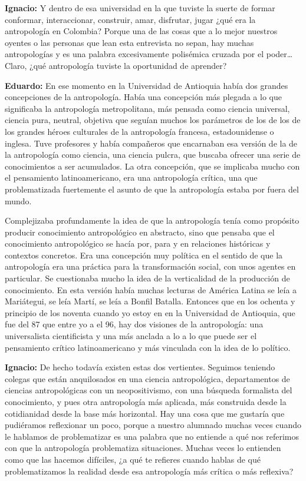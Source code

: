 \documentclass[
]{interact}
\begin{document}
\textbf{Ignacio:} Y dentro de esa universidad en la que tuviste la
suerte de formar conformar, interaccionar, construir, amar, disfrutar,
jugar ¿qué era la antropología en Colombia? Porque una de las cosas que
a lo mejor nuestros oyentes o las personas que lean esta entrevista no
sepan, hay muchas antropologías y es una palabra excesivamente
polisémica cruzada por el poder\ldots{} Claro, ¿qué antropología tuviste
la oportunidad de aprender?

\textbf{Eduardo:} En ese momento en la Universidad de Antioquia había
dos grandes concepciones de la antropología. Había una concepción más
plegada a lo que significaba la antropología metropolitana, más pensada
como ciencia universal, ciencia pura, neutral, objetiva que seguían
muchos los parámetros de los de los de los grandes héroes culturales de
la antropología francesa, estadounidense o inglesa. Tuve profesores y
había compañeros que encarnaban esa versión de la de la antropología
como ciencia, una ciencia pulcra, que buscaba ofrecer una serie de
conocimientos a ser acumulados. La otra concepción, que se implicaba
mucho con el pensamiento latinoamericano, era una antropología crítica,
una que problematizada fuertemente el asunto de que la antropología
estaba por fuera del mundo.

Complejizaba profundamente la idea de que la antropología tenía como
propósito producir conocimiento antropológico en abstracto, sino que
pensaba que el conocimiento antropológico se hacía por, para y en
relaciones históricas y contextos concretos. Era una concepción muy
política en el sentido de que la antropología era una práctica para la
transformación social, con unos agentes en particular. Se cuestionaba
mucho la idea de la verticalidad de la producción de conocimiento. En
esta versión había muchas lecturas de América Latina se leía a
Mariátegui, se leía Martí, se leía a Bonfil Batalla. Entonces que en los
ochenta y principio de los noventa cuando yo estoy en en la Universidad
de Antioquia, que fue del 87 que entre yo a el 96, hay dos visiones de
la antropología: una universalista cientificista y una más anclada a lo
a lo que puede ser el pensamiento crítico latinoamericano y más
vinculada con la idea de lo político.

\textbf{Ignacio:} De hecho todavía existen estas dos vertientes.
Seguimos teniendo colegas que están anquilosados en una ciencia
antropológica, departamentos de ciencias antropológicas con un
neopositivismo, con una búsqueda formalista del conocimiento, y pues
otra antropología más aplicada, más construida desde la cotidianidad
desde la base más horizontal. Hay una cosa que me gustaría que
pudiéramos reflexionar un poco, porque a nuestro alumnado muchas veces
cuando le hablamos de problematizar es una palabra que no entiende a qué
nos referimos con que la antropología problematiza situaciones. Muchas
veces lo entienden como que las hacemos difíciles, ¿a qué te refieres
cuando hablas de qué problematizamos la realidad desde esa antropología
más crítica o más reflexiva?
\end{document}

